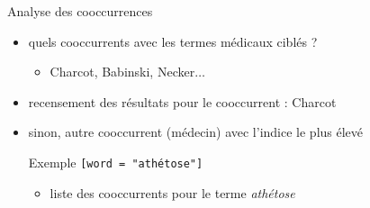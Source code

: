 \begin{frame}{Analyse des cooccurrences}
	\begin{itemize}
		\item quels cooccurrents avec les termes médicaux ciblés ? 
		\begin{itemize}
			\item Charcot, Babinski, Necker$\dots$
		\end{itemize}
		\item recensement des résultats pour le cooccurrent : Charcot
		\item sinon, autre cooccurrent (médecin) avec l'indice le plus élevé\\
		\begin{alertblock}{Exemple}
			\texttt{[word = "athétose"]} 
			\begin{itemize}
				\item liste des cooccurrents pour le terme \textit{athétose}
			\end{itemize}
		\end{alertblock}
	\end{itemize}
\end{frame}

